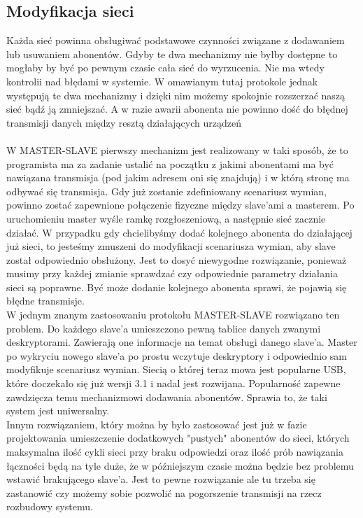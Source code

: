 	\subsection{Modyfikacja sieci}
		Każda sieć powinna obsługiwać podstawowe czynności związane z dodawaniem lub usuwaniem abonentów. Gdyby te dwa mechanizmy nie byłby dostępne to mogłaby by być po pewnym czasie cała sieć do wyrzucenia. Nie ma wtedy kontrolii nad błędami w systemie. W omawianym tutaj protokole jednak występują te dwa mechanizmy i dzięki nim możemy spokojnie rozszerzać naszą sieć bądź ją zmniejszać. A w razie awarii abonenta nie powinno dość do błędnej transmisji danych między resztą działających urządzeń
		\\
		\\
		 W MASTER-SLAVE pierwszy mechanizm jest realizowany w taki sposób, że to programista ma za zadanie ustalić na początku z jakimi abonentami ma być nawiązana transmisja (pod jakim adresem oni się znajdują) i w którą stronę ma odbywać się transmisja. Gdy już zostanie zdefiniowany scenariusz wymian, powinno zostać zapewnione połączenie fizyczne między slave'ami a masterem. Po uruchomieniu master wyśle ramkę rozgłoszeniową, a następnie sieć zacznie działać. W przypadku gdy chcielibyśmy dodać kolejnego abonenta do działającej już sieci, to jesteśmy zmuszeni do modyfikacji scenariusza wymian, aby slave został odpowiednio obsłużony. Jest to dosyć niewygodne rozwiązanie, ponieważ musimy przy każdej zmianie sprawdzać czy odpowiednie parametry działania sieci są poprawne. Być może dodanie kolejnego abonenta sprawi, że pojawią się błędne transmisje. 
		 \\
		 W jednym znanym zastosowaniu protokołu MASTER-SLAVE rozwiązano ten problem. Do każdego slave'a umieszczono pewną tablice danych zwanymi deskryptorami. Zawierają one informacje na temat obsługi danego slave'a. Master po wykryciu nowego slave'a po prostu wczytuje deskryptory i odpowiednio sam modyfikuje scenariusz wymian. Siecią o której teraz mowa jest popularne USB, które doczekało się już wersji 3.1 i nadal jest rozwijana. Popularność zapewne zawdzięcza temu mechanizmowi dodawania abonentów. Sprawia to, że taki system jest uniwersalny. 
		 \\
		 Innym rozwiązaniem, który można by było zastosować jest już w fazie projektowania umieszczenie dodatkowych "pustych" abonentów do sieci, których maksymalna ilość cykli sieci przy braku odpowiedzi oraz ilość prób nawiązania łączności będą na tyle duże, że w późniejszym czasie można będzie bez problemu wstawić brakującego slave'a. Jest to pewne rozwiązanie ale tu trzeba się zastanowić czy możemy sobie pozwolić na pogorszenie transmisji na rzecz rozbudowy systemu.
